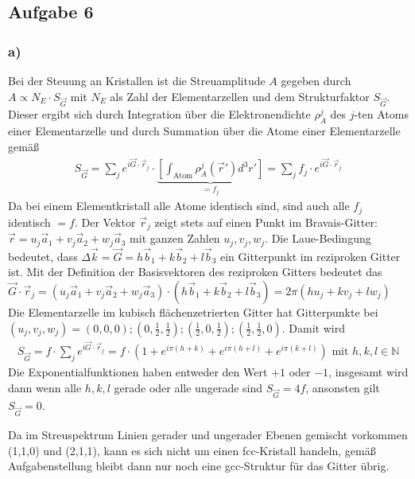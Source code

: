 \documentclass[11pt]{article}
\newcommand*{\NN}{\mathbb N}
\begin{document}
\subsection*{Aufgabe 6}
\subsubsection*{a)}
Bei der Steuung an Kristallen ist die Streuamplitude $A$ gegeben durch
$A \propto N_E \cdot S_{\vec G}$ mit $N_E$ als Zahl der Elementarzellen und
dem Strukturfaktor $S_{\vec G}$. Dieser ergibt sich durch Integration über die
Elektronendichte $\rho_A^j$ des $j$-ten Atoms einer Elementarzelle und durch
Summation über die Atome einer Elementarzelle gemäß
\begin{align*}
  S_{\vec G} = \sum_{j} e^{i \vec G \cdot \vec r_j} \cdot \underbrace{
  \left[ \int_{\text{Atom}}\rho_A^j (\vec r') d^3 r'  \right] }_{= f_j} =
  \sum_{j} f_j \cdot e^{i \vec G \cdot \vec r_j}
\end{align*}
Da bei einem Elementkristall alle Atome identisch sind, sind auch alle $f_j$
identisch $= f$. Der Vektor $\vec r_j$ zeigt stets auf einen Punkt
im Bravais-Gitter: $\vec r = u_j \vec a_1 + v_j \vec a_2 + w_j \vec a_3$ mit
ganzen Zahlen $u_j, v_j, w_j$. Die Laue-Bedingung bedeutet, dass
$\Delta \vec k = \vec G = h \vec b_1 + k \vec b_2 + l \vec b_3$ ein Gitterpunkt
im reziproken Gitter ist. Mit der Definition der Basisvektoren des reziproken
Gitters bedeutet das $\vec G \cdot \vec r_j =  (u_j \vec a_1 + v_j \vec a_2 + w_j \vec a_3)
\cdot (h \vec b_1 + k \vec b_2 + l \vec b_3) = 2 \pi (h u_j + k v_j + l w_j)$
Die Elementarzelle im kubisch flächenzetrierten Gitter hat Gitterpunkte bei
$(u_j,v_j,w_j) = (0,0,0); (0,\frac{1}{2},\frac{1}{2}); (\frac{1}{2}, 0, \frac{1}{2});
(\frac{1}{2},\frac{1}{2}, 0)$. Damit wird
\begin{align*}
  S_{\vec G} = f \cdot \sum_{j}  e^{i \vec G \cdot \vec r_j} =
  f \cdot \left(1 + e^{i \pi (h + k)} + e^{i \pi (h + l)} +e^{i \pi (k + l)} \right)
  \text{ mit } h, k, l \in \NN
\end{align*}
Die Exponentialfunktionen haben entweder den Wert $+1$ oder $-1$, insgesamt wird dann
wenn alle $h, k, l$ gerade oder alle ungerade sind $S_{\vec G} = 4 f$, ansonsten gilt
$S_{\vec G} = 0$.

Da im Streuspektrum Linien gerader und ungerader Ebenen gemischt vorkommen
(1,1,0) und (2,1,1), kann es sich nicht um einen fcc-Kristall handeln,
gemäß Aufgabenstellung bleibt dann nur noch eine gcc-Struktur für das Gitter übrig.
\end{document}
